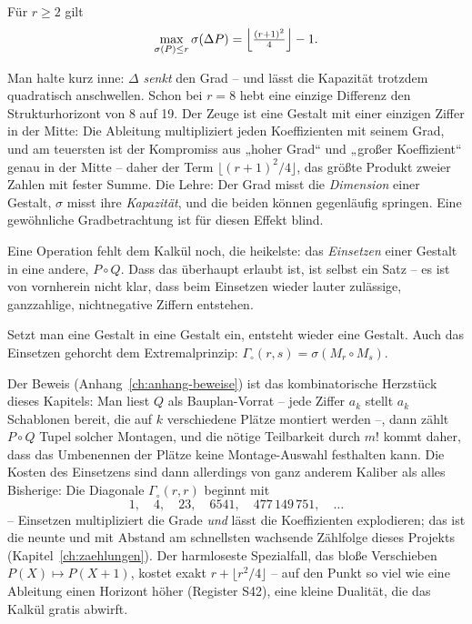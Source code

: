 \begin{satz}
Für $r\ge2$ gilt
\[
\max_{\sigma(P)\le r}\sigma(\Delta P)
=\Bigl\lfloor\tfrac{(r+1)^2}{4}\Bigr\rfloor-1 .
\]
\end{satz}

Man halte kurz inne: $\Delta$ \emph{senkt} den Grad -- und lässt die
Kapazität trotzdem quadratisch anschwellen. Schon bei $r=8$ hebt eine
einzige Differenz den Strukturhorizont von 8 auf 19. Der Zeuge ist
eine Gestalt mit einer einzigen Ziffer in der Mitte: Die Ableitung
multipliziert jeden Koeffizienten mit seinem Grad, und am teuersten
ist der Kompromiss aus „hoher Grad“ und „großer Koeffizient“ genau
in der Mitte -- daher der Term $\lfloor(r{+}1)^2/4\rfloor$, das
größte Produkt zweier Zahlen mit fester Summe. Die Lehre: Der Grad
misst die \emph{Dimension} einer Gestalt, $\sigma$ misst ihre
\emph{Kapazität}, und die beiden können gegenläufig springen. Eine
gewöhnliche Gradbetrachtung ist für diesen Effekt blind.

Eine Operation fehlt dem Kalkül noch, die heikelste: das
\emph{Einsetzen} einer Gestalt in eine andere, $P\circ Q$. Dass das
überhaupt erlaubt ist, ist selbst ein Satz -- es ist von vornherein
nicht klar, dass beim Einsetzen wieder lauter zulässige, ganzzahlige,
nichtnegative Ziffern entstehen.

\begin{satz}
Setzt man eine Gestalt in eine Gestalt ein, entsteht wieder eine
Gestalt. Auch das Einsetzen gehorcht dem Extremalprinzip:
$\Gamma_\circ(r,s)=\sigma(M_r\circ M_s)$.
\end{satz}

Der Beweis (Anhang~\ref{ch:anhang-beweise}) ist das kombinatorische
Herzstück dieses Kapitels: Man liest $Q$ als Bauplan-Vorrat --
jede Ziffer $a_k$ stellt $a_k$ Schablonen bereit, die auf $k$
verschiedene Plätze montiert werden --, dann zählt $P\circ Q$
Tupel solcher Montagen, und die nötige Teilbarkeit durch $m!$
kommt daher, dass das Umbenennen der Plätze keine Montage-Auswahl
festhalten kann. Die Kosten des Einsetzens sind dann allerdings von
ganz anderem Kaliber als alles Bisherige: Die Diagonale
$\Gamma_\circ(r,r)$ beginnt mit
\[
1,\quad 4,\quad 23,\quad 6541,\quad 477\,149\,751,\quad\ldots
\]
-- Einsetzen multipliziert die Grade \emph{und} lässt die
Koeffizienten explodieren; das ist die neunte und mit Abstand am
schnellsten wachsende Zählfolge dieses Projekts
(Kapitel~\ref{ch:zaehlungen}). Der harmloseste Spezialfall, das
bloße Verschieben $P(X)\mapsto P(X{+}1)$, kostet exakt
$r+\lfloor r^2/4\rfloor$ -- auf den Punkt so viel wie eine Ableitung
einen Horizont höher (Register S42), eine kleine Dualität, die das
Kalkül gratis abwirft.

